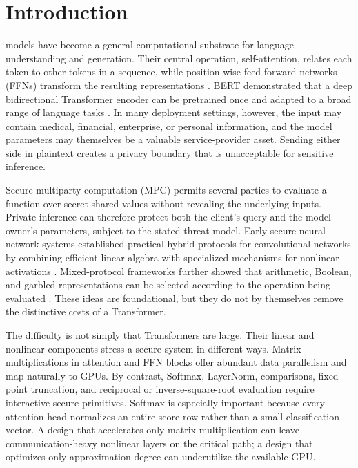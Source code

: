 \section{Introduction}
\label{sec:introduction}
 models have become a general computational substrate for language understanding and generation. Their central operation, self-attention, relates each token to other tokens in a sequence, while position-wise feed-forward networks (FFNs) transform the resulting representations \cite{vaswani2017attention}. BERT demonstrated that a deep bidirectional Transformer encoder can be pretrained once and adapted to a broad range of language tasks \cite{devlin2019bert}. In many deployment settings, however, the input may contain medical, financial, enterprise, or personal information, and the model parameters may themselves be a valuable service-provider asset. Sending either side in plaintext creates a privacy boundary that is unacceptable for sensitive inference.

Secure multiparty computation (MPC) permits several parties to evaluate a function over secret-shared values without revealing the underlying inputs. Private inference can therefore protect both the client's query and the model owner's parameters, subject to the stated threat model. Early secure neural-network systems established practical hybrid protocols for convolutional networks by combining efficient linear algebra with specialized mechanisms for nonlinear activations \cite{juvekar2018gazelle,mishra2020delphi}. Mixed-protocol frameworks further showed that arithmetic, Boolean, and garbled representations can be selected according to the operation being evaluated \cite{mohassel2018aby3}. These ideas are foundational, but they do not by themselves remove the distinctive costs of a Transformer.

The difficulty is not simply that Transformers are large. Their linear and nonlinear components stress a secure system in different ways. Matrix multiplications in attention and FFN blocks offer abundant data parallelism and map naturally to GPUs. By contrast, Softmax, LayerNorm, comparisons, fixed-point truncation, and reciprocal or inverse-square-root evaluation require interactive secure primitives. Softmax is especially important because every attention head normalizes an entire score row rather than a small classification vector. A design that accelerates only matrix multiplication can leave communication-heavy nonlinear layers on the critical path; a design that optimizes only approximation degree can underutilize the available GPU.

